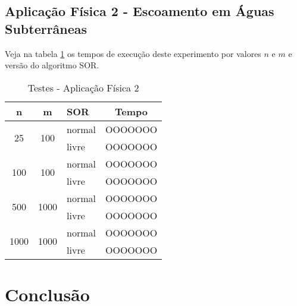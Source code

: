 \documentclass[
	11pt,				%
	oneside,			%
	a4paper,			%
	english,			%
	brazil,				%
	]{article}
\begin{document}
\subsection{Aplicação Física 2 - Escoamento em Águas Subterrâneas}
\lipsum[9]

Veja na tabela \ref{tab:taf2} os tempos de execução deste experimento por 
valores $n$ e $m$ e versão do algoritmo SOR.

\begin{table}[ht]
\centering
\begin{tabular}{|c|c|l|c|}
\hline 
\textbf{n} & \textbf{m} & \textbf{SOR} & \textbf{Tempo} \\
\hline
\multirow{2}{*}{25}    & \multirow{2}{*}{100}  & normal & OOOOOOO \\
                       &                       & livre  & OOOOOOO \\
\hline
\multirow{2}{*}{100}   & \multirow{2}{*}{100}  & normal & OOOOOOO \\
                       &                       & livre  & OOOOOOO \\
\hline
\multirow{2}{*}{500}   & \multirow{2}{*}{1000} & normal & OOOOOOO \\
                       &                       & livre  & OOOOOOO \\
\hline
\multirow{2}{*}{1000}  & \multirow{2}{*}{1000} & normal & OOOOOOO \\
                       &                       & livre  & OOOOOOO \\
\hline
\end{tabular}
\caption{Testes - Aplicação Física 2}
\label{tab:taf2}
\end{table}

\section{Conclusão}
\lipsum[5]

%
\end{document}

